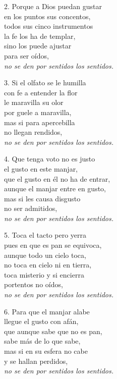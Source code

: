 \def\tagline{\emph{no se den por sentidos los sentidos.}}

\begin{blocklyrics}
2. Porque a Dios puedan gustar\\
en los puntos sus concentos,\\
todos sus cinco instrumentos\\
la fe los ha de templar,\\
sino los puede ajustar\\
para ser oídos,\\
\tagline

3. Si el olfato se le humilla\\
con fe a entender la flor\\ 
le maravilla su olor\\
por guele a maravilla,\\
mas si para apercebilla\\
no llegan rendidos,\\
\tagline

4. Que tenga voto no es justo\\
el gusto en este manjar,\\
que el gusto en él no ha de entrar,\\
aunque el manjar entre en gusto,\\
mas si les causa disgusto\\
no ser admitidos,\\
\tagline

5. Toca el tacto pero yerra\\%
pues en que es pan se equivoca,\\
aunque todo un cielo toca,\\
no toca en cielo ni en tierra,\\
toca misterio y si encierra\\
portentos no oídos,\\
\tagline

6. Para que el manjar alabe\\
llegue el gusto con afán,\\
que aunque sabe que no es pan,\\
sabe más de lo que sabe,\\
mas si en su esfera no cabe\\
y se hallan perdidos,\\
\tagline
\end{blocklyrics}